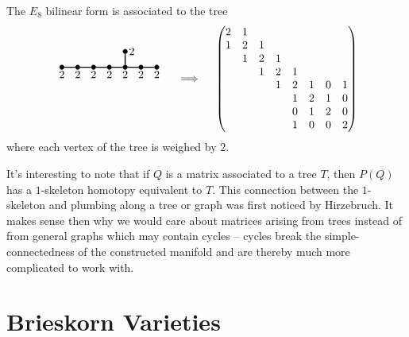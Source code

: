 \begin{proposition}
	The ${E_8}$ bilinear form is associated to the tree
	\[
		\begin{tikzpicture}
			\tikzset{dynode/.style={circle, draw, fill=black,
						minimum size=4pt, inner sep=0pt}}
			\tikzset{dyline/.style={line width=1pt}}
			\tikzset{dydash/.style={line width=1pt, dashed}}

			\begin{scope}[yshift=-10em, xshift=0]
				\node[dynode] (a1) at (0,0) {};
				\node[dynode] (a2) at (0.5,0) {};
				\node[dynode] (a3) at (1,0) {};
				\node[dynode] (a4) at (1.5,0) {};
				\node[dynode] (a5) at (2,0) {};
				\node[dynode] (a6) at (2.5,0) {};
				\node[dynode] (a7) at (3,0) {};
				\node[dynode] (a8) at (2,0.5) {};

				\draw[dyline] (a1) -- (a2) -- (a3) -- (a4) -- (a5) -- (a6) -- (a7);
				\draw[dyline] (a5) -- (a8);

				\node[below] () at (a1) {$2$};
				\node[below] () at (a2) {$2$};
				\node[below] () at (a3) {$2$};
				\node[below] () at (a4) {$2$};
				\node[below] () at (a5) {$2$};
				\node[below] () at (a6) {$2$};
				\node[below] () at (a7) {$2$};
				\node[right] () at (a8) {$2$};
			\end{scope}
		\end{tikzpicture}
		\quad\implies\quad
		\begin{pmatrix}
			2 & 1 &   &   &   &   &   &   \\
			1 & 2 & 1 &   &   &   &   &   \\
			  & 1 & 2 & 1 &   &   &   &   \\
			  &   & 1 & 2 & 1 &   &   &   \\
			  &   &   & 1 & 2 & 1 & 0 & 1 \\
			  &   &   &   & 1 & 2 & 1 & 0 \\
			  &   &   &   & 0 & 1 & 2 & 0 \\
			  &   &   &   & 1 & 0 & 0 & 2 \\
		\end{pmatrix}
	\]
	where each vertex of the tree is weighed by $2$.
\end{proposition}

It's interesting to note that if $Q$ is a matrix associated to a tree $T$, then $P(Q)$ has a $1$-skeleton homotopy equivalent to $T$. This connection between the $1$-skeleton and plumbing along a tree or graph was first noticed by Hirzebruch. 
It makes sense then why we would care about matrices arising from trees instead of from general graphs which may contain cycles -- cycles break the simple-connectedness of the constructed manifold and are thereby much more complicated to work with.

\pagebreak
\section{Brieskorn Varieties}\label{sec:brieskorn}
\cite{milnor1968hypersurfaces}
\cite{kauffman1987knots}
